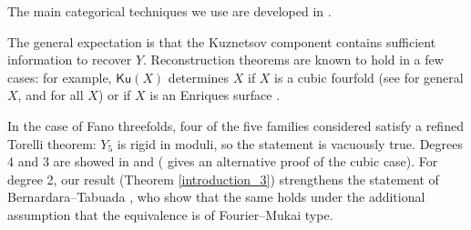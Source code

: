 \documentclass[11pt]{amsart}
\theoremstyle{definition}
\newcommand{\pr}[1]{\mathbb P^{#1}}
\newcommand{\AAA}[1]{\textcolor{red}{#1}}
\newcommand{\Ku}{\mathsf{Ku}}
\begin{document}
The main categorical techniques we use are developed in \cite{BLMS17, Kuz11_base_change}.





The general expectation is that the Kuznetsov component contains sufficient information to recover $Y$.
Reconstruction theorems are known to hold in a few cases: for example, $\Ku(X)$ determines $X$ if $X$ is a cubic fourfold (see \cite{BLMS17} for general $X$, and \cite{LPZ18} for all $X$) or if $X$ is an Enriques surface \cite{LNSZ19,LSZ21}.

In the case of Fano threefolds, four of the five families considered satisfy a refined Torelli theorem: $Y_5$ is rigid in moduli, so the statement is vacuously true. Degrees 4 and 3 are showed in \cite{BO95} and \cite{BMMS12} (\cite{PY20} gives an alternative proof of the cubic case). For degree 2, our result (Theorem \ref{introduction_3}) strengthens the statement of Bernardara--Tabuada \cite[Corollary~3.1(iii)]{BT16}, who show that the same holds under the additional assumption that the equivalence is of Fourier--Mukai type. 
\end{document}
